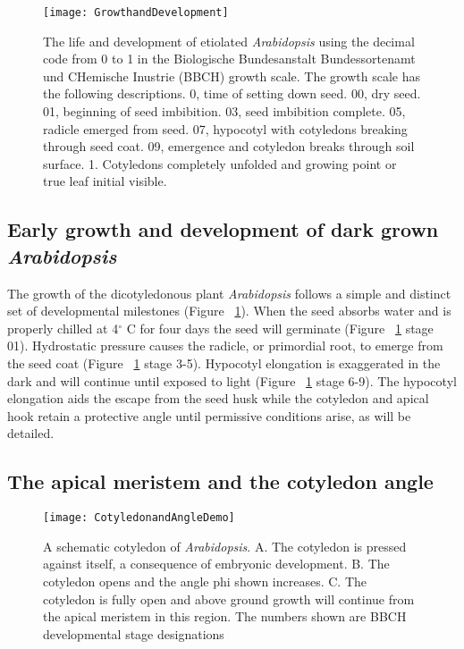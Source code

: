 \begin{figure}
\texttt{[image: GrowthandDevelopment]}
\caption{The life and development of etiolated {\it Arabidopsis} using the decimal code from 0 to 1 in the Biologische Bundesanstalt Bundessortenamt und CHemische Inustrie (BBCH) growth scale. The growth scale has the following descriptions. 0, time of setting down seed. 00, dry seed. 01, beginning of seed imbibition. 03, seed imbibition complete. 05, radicle emerged from seed. 07, hypocotyl with cotyledons breaking through seed coat. 09, emergence and cotyledon breaks through soil surface. 1. Cotyledons completely unfolded and growing point or true leaf initial visible.}
\label{fig:GrowthandDevelopment}
\end{figure}

\subsection{Early growth and development of dark grown {\it Arabidopsis}}

The growth of the dicotyledonous plant {\it Arabidopsis} follows a simple and distinct set of developmental milestones (Figure ~\ref{fig:GrowthandDevelopment}). When the seed absorbs water and is properly chilled at 4${}^\circ$ C for four days the seed will germinate (Figure ~\ref{fig:GrowthandDevelopment} stage 01). Hydrostatic pressure causes the radicle, or primordial root, to emerge from the seed coat (Figure ~\ref{fig:GrowthandDevelopment} stage 3-5). Hypocotyl elongation is exaggerated in the dark and will continue until exposed to light (Figure ~\ref{fig:GrowthandDevelopment} stage 6-9)\cite{lehman1996hookless1}. The hypocotyl elongation aids the escape from the seed husk while the cotyledon and apical hook retain a protective angle until permissive conditions arise, as will be detailed.

\subsection{The apical meristem and the cotyledon angle}

\begin{figure}
\texttt{[image: CotyledonandAngleDemo]}
\caption{A schematic cotyledon of {\it Arabidopsis}. A. The cotyledon is pressed against itself, a consequence of embryonic development. B. The cotyledon opens and the angle phi shown increases. C. The cotyledon is fully open and above ground growth will continue from the apical meristem in this region. The numbers shown are BBCH developmental stage designations}
\label{fig:CotyledonandAngleDemo}
\end{figure}

